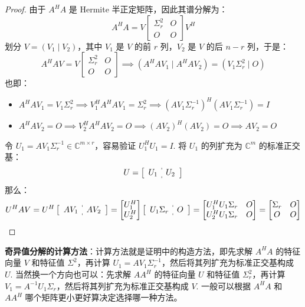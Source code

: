 \begin{proof}
由于 $A^HA$ 是 Hermite 半正定矩阵，因此其谱分解为：
\[
    A^HA=V\begin{bmatrix}\Sigma^2_r&O\\O&O\end{bmatrix}V^H
\]
划分 $V=(V_1\mid V_2)$，其中 $V_1$ 是 $V$ 的前 $r$ 列，$V_2$ 是 $V$ 的后 $n-r$ 列，于是：
\[
    A^HAV=V\begin{bmatrix}\Sigma^2_r&O\\O&O\end{bmatrix}\implies\left(A^HAV_1\mid A^HAV_2\right)=\left(V_1\Sigma^2_r\mid O\right)
\]
也即：
\begin{itemize}
    \item $A^HAV_1=V_1\Sigma^2_r\implies V_1^HA^HAV_1=\Sigma^2_r\implies(AV_1\Sigma_r^{-1})^H(AV_1\Sigma_r^{-1})=I$
    \item $A^HAV_2=O\implies V_2^HA^HAV_2=O\implies(AV_2)^H(AV_2)=O\implies AV_2=O$
\end{itemize}
令 $U_1=AV_1\Sigma^{-1}_r\in\mathbb C^{m\times r}$，容易验证 $U_1^HU_1=I$.  将 $U_1$ 的列扩充为 $\mathbb C^m$ 的标准正交基：
\[
    U=\left[\begin{array}{c:c}U_1&U_2\end{array}\right]
\]
那么：
\[
    U^HAV=U^H\left[\begin{array}{c:c}AV_1&AV_2\end{array}\right]=\begin{bmatrix}U_1^H\\U_2^H\end{bmatrix}\left[\begin{array}{c:c}U_1\Sigma_r&O\end{array}\right]=\begin{bmatrix}U_1^HU_1\Sigma_r&O\\U_2^HU_1\Sigma_r&O\end{bmatrix}=\begin{bmatrix}\Sigma_r&O\\O&O\end{bmatrix}
\]
\end{proof}
\noindent\textbf{奇异值分解的计算方法}：计算方法就是证明中的构造方法，即先求解 $A^HA$ 的特征向量 $V$ 和特征值 $\Sigma^2$，再计算 $U_1=AV_1\Sigma_r^{-1}$，然后将其列扩充为标准正交基构成 $U$.
当然换一个方向也可以：先求解 $AA^H$ 的特征向量 $U$ 和特征值 $\Sigma^2_r$，再计算 $V_1=A^{-1}U_1\Sigma_r$，然后将其列扩充为标准正交基构成 $V$. 一般可以根据 $A^HA$ 和 $AA^H$ 哪个矩阵更小更好算决定选择哪一种方法。

